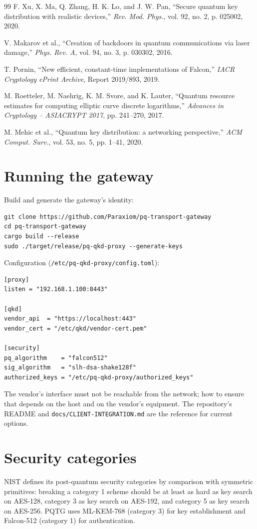 \documentclass[11pt,letterpaper]{article}
\begin{document}
\begin{thebibliography}{99}
F. Xu, X. Ma, Q. Zhang, H. K. Lo, and J. W. Pan,
``Secure quantum key distribution with realistic devices,''
\textit{Rev. Mod. Phys.}, vol. 92, no. 2, p. 025002, 2020.

V. Makarov et al.,
``Creation of backdoors in quantum communications via laser damage,''
\textit{Phys. Rev. A}, vol. 94, no. 3, p. 030302, 2016.

T. Pornin,
``New efficient, constant-time implementations of Falcon,''
\textit{IACR Cryptology ePrint Archive}, Report 2019/893, 2019.

M. Roetteler, M. Naehrig, K. M. Svore, and K. Lauter,
``Quantum resource estimates for computing elliptic curve discrete logarithms,''
\textit{Advances in Cryptology -- ASIACRYPT 2017}, pp. 241--270, 2017.

M. Mehic et al.,
``Quantum key distribution: a networking perspective,''
\textit{ACM Comput. Surv.}, vol. 53, no. 5, pp. 1--41, 2020.

\end{thebibliography}

\appendix

\section{Running the gateway}

Build and generate the gateway's identity:
\begin{verbatim}
git clone https://github.com/Paraxiom/pq-transport-gateway
cd pq-transport-gateway
cargo build --release
sudo ./target/release/pq-qkd-proxy --generate-keys
\end{verbatim}

Configuration (\texttt{/etc/pq-qkd-proxy/config.toml}):
\begin{verbatim}
[proxy]
listen = "192.168.1.100:8443"

[qkd]
vendor_api  = "https://localhost:443"
vendor_cert = "/etc/qkd/vendor-cert.pem"

[security]
pq_algorithm    = "falcon512"
sig_algorithm   = "slh-dsa-shake128f"
authorized_keys = "/etc/pq-qkd-proxy/authorized_keys"
\end{verbatim}

The vendor's interface must not be reachable from the network; how to ensure that depends on the host and on the vendor's equipment. The repository's README and \texttt{docs/CLIENT-INTEGRATION.md} are the reference for current options.

\section{Security categories}

NIST defines its post-quantum security categories by comparison with symmetric primitives: breaking a category 1 scheme should be at least as hard as key search on AES-128, category 3 as key search on AES-192, and category 5 as key search on AES-256. PQTG uses ML-KEM-768 (category 3) for key establishment and Falcon-512 (category 1) for authentication.
\end{document}
